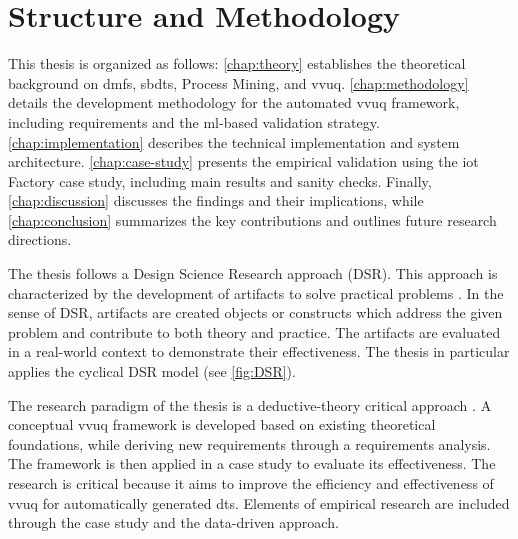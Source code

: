 \section{Structure and Methodology}

This thesis is organized as follows: \autoref{chap:theory} establishes the theoretical background on \gls{dmfs}, \gls{sbdt}s, Process Mining, and \gls{vvuq}. \autoref{chap:methodology} details the development methodology for the automated \gls{vvuq} framework, including requirements and the \gls{ml}-based validation strategy. \autoref{chap:implementation} describes the technical implementation and system architecture. \autoref{chap:case-study} presents the empirical validation using the \gls{iot} Factory case study, including main results and sanity checks. Finally, \autoref{chap:discussion} discusses the findings and their implications, while \autoref{chap:conclusion} summarizes the key contributions and outlines future research directions.

The thesis follows a Design Science Research approach (DSR). This approach is characterized by the development of artifacts to solve practical problems \autocite{hevner2004design,peffers2007design}. In the sense of DSR, artifacts are created objects or constructs which address the given problem and contribute to both theory and practice. The artifacts are evaluated in a real-world context to demonstrate their effectiveness. The thesis in particular applies the cyclical DSR model (see \autoref{fig:DSR}).

The research paradigm of the thesis is a deductive-theory critical approach \autocite{eberhard1987einfuhrung}. A conceptual \gls{vvuq} framework is developed based on existing theoretical foundations, while deriving new requirements through a requirements analysis. The framework is then applied in a case study to evaluate its effectiveness. The research is critical because it aims to improve the efficiency and effectiveness of \gls{vvuq} for automatically generated \gls{dt}s. Elements of empirical research are included through the case study and the data-driven approach.

